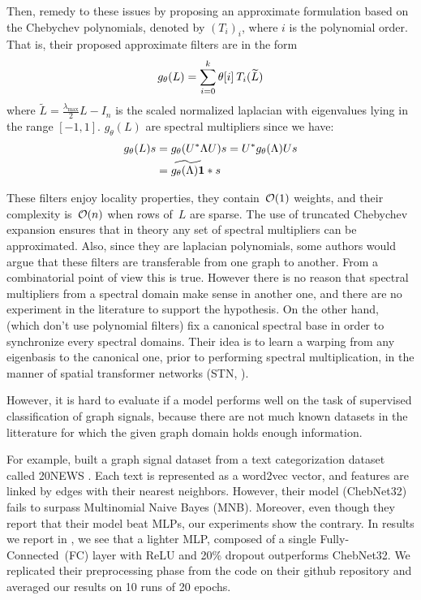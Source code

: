 Then, \cite{defferrard2016convolutional} remedy to these issues by proposing an approximate formulation based on the Chebychev polynomials, denoted by $(T_i)_i$, where $i$ is the polynomial order.
That is, their proposed approximate filters are in the form
\begin{gather}
g_\theta(L) = \sum_{i=0}^k \theta[i] \h{2} T_i(\widetilde{L})
\end{gather}
where $\widetilde{L} = \frac{\lambda_{\max}}2L - I_n$ is the scaled normalized laplacian with eigenvalues lying in the range $[-1,1]$. $g_\theta(L)$ are spectral multipliers since we have:
\begin{align}
g_\theta(L)s &= g_\theta(U^*\Lambda U)s
= U^* g_\theta(\Lambda) Us\nonumber\\
&= \widetilde{g_\theta(\Lambda) \textbf1} \ast s
\end{align}

These filters enjoy locality properties, they contain~$\co(1)$ weights, and their complexity is~$\co(n)$ when rows of~$L$ are sparse. The use of truncated Chebychev expansion \citep{hammond2011wavelets} ensures that in theory any set of spectral multipliers can be approximated. Also, since they are laplacian polynomials, some authors would argue that these filters are transferable from one graph to another. From a combinatorial point of view this is true. However there is no reason that spectral multipliers from a spectral domain make sense in another one, and there are no experiment in the literature to support the hypothesis. On the other hand, \citep{yi2016syncspeccnn} (which don't use polynomial filters) fix a canonical spectral base in order to synchronize every spectral domains. Their idea is to learn a warping from any eigenbasis to the canonical one, prior to performing spectral multiplication, in the manner of spatial transformer networks (STN, \cite{jaderberg2015spatial}).

However, it is hard to evaluate if a model performs well on the task of supervised classification of graph signals, because there are not much known datasets in the litterature for which the given graph domain holds enough information.

For example, \citeauthor{defferrard2016convolutional} built a graph signal dataset from a text categorization dataset called 20NEWS \citep{joachims1996probabilistic}. Each text is represented as a word2vec vector, and features are linked by edges with their nearest neighbors. However, their model (ChebNet32) fails to surpass Multinomial Naive Bayes (MNB). Moreover, even though they report that their model beat MLPs, our experiments show the contrary. In results we report in , we see that a lighter MLP, composed of a single Fully-Connected~(FC) layer with ReLU and 20\% dropout outperforms ChebNet32. We replicated their preprocessing phase from the code on their github repository and averaged our results on 10 runs of 20 epochs.

